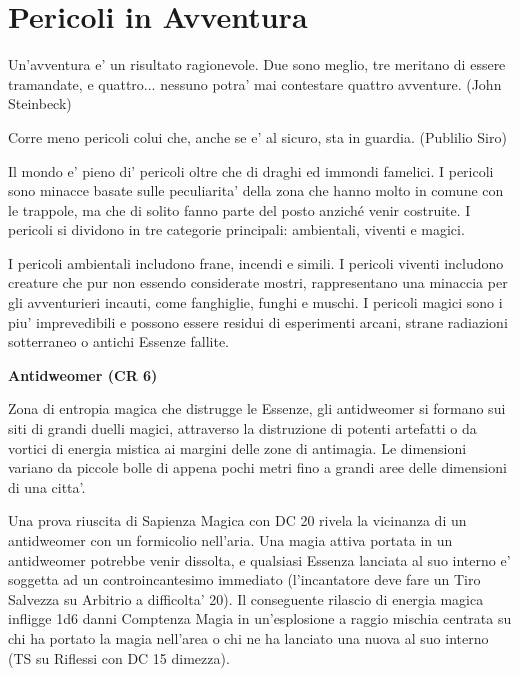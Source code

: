 \documentclass[a4paper,11pt,twoside,openany]{dndbook}
\begin{document}
{\pagebreak

\section{Pericoli in Avventura}


\begin{quotebox}
		{Un'avventura e' un risultato ragionevole. Due sono meglio, tre meritano di essere tramandate, e quattro... nessuno potra' mai contestare quattro avventure. (John Steinbeck)}
\end{quotebox}


\label{pericoli-in-avventura}
\begin{quotebox}Corre meno pericoli colui che, anche se e' al sicuro, sta in guardia. (Publilio Siro)
\end{quotebox}
Il mondo e' pieno di' pericoli oltre che di draghi ed immondi famelici. I pericoli sono minacce basate sulle peculiarita' della zona che hanno molto in comune con le trappole, ma che di solito fanno parte del posto anziché venir costruite. I pericoli si dividono in tre categorie principali: ambientali, viventi e magici.

I pericoli ambientali includono frane, incendi e simili. I pericoli viventi includono creature che pur non essendo considerate mostri, rappresentano una minaccia per gli av­venturieri incauti, come fanghiglie, funghi e muschi. I pericoli magici sono i piu' imprevedibili e possono essere residui di esperimenti arcani, strane radiazioni sotterraneo o antichi Essenze fallite.

\textbf{Antidweomer (CR 6)}

Zona di entropia magica che distrugge le Essenze, gli antidweomer si formano sui siti di grandi duelli magici, attraverso la distruzione di potenti artefatti o da vortici di energia mistica ai margini delle zone di antimagia. Le dimensioni variano da piccole bolle di appena pochi metri fino a grandi aree delle dimensioni di una citta'. 

Una prova riuscita di Sapienza Magica con DC 20 rivela la vicinanza di un antidweomer con un formicolio nell'aria. Una magia attiva portata in un antidweomer potrebbe venir dissolta, e qualsiasi Essenza lanciata al suo interno e' soggetta ad un controincantesimo immediato (l'incantatore deve fare un Tiro Salvezza su Arbitrio a difficolta' 20). Il conseguente rilascio di energia magica infligge 1d6 danni Comptenza Magia in un'esplosione a raggio mischia centrata su chi ha portato la magia nell'area o chi ne ha lanciato una nuova al suo interno (TS su Riflessi con DC 15 dimezza).

}
\end{document}
